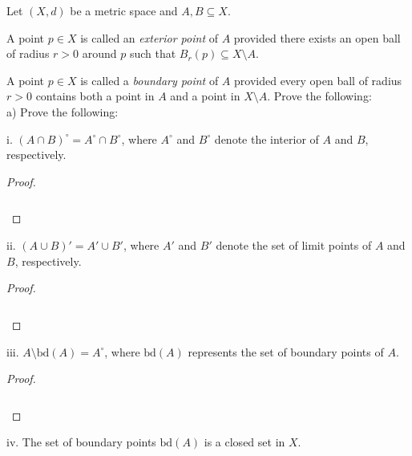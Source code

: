 Let $(X, d)$ be a metric space and $A, B \subseteq X$. 

A point $p \in X$ is called an \emph{exterior point} of $A$ provided there exists an open ball of radius $r > 0$ around
$p$ such that $B_r(p) \subseteq X \setminus A$.

A point $p \in X$ is called a \emph{boundary point} of $A$ provided every open ball of radius $r > 0$ contains both
a point in $A$ and a point in $X \setminus A$. Prove the following: \\

a) Prove the following:

i.  $(A \cap B)^{\circ} = A^{\circ} \cap B^{\circ}$, where $A^{\circ}$ and $B^{\circ}$ denote the interior of $A$ and 
    $B$, respectively. \ \\

\begin{proof}\renewcommand{\qedsymbol}{}\ \\\\
    \begin{align*}
    \end{align*}
\end{proof}

\pagebreak

ii.  $(A \cup B)' = A' \cup B'$, where $A'$ and $B'$ denote the set of limit points of $A$ and $B$, respectively.\ \\

\begin{proof}\renewcommand{\qedsymbol}{}\ \\\\
    \begin{align*}
    \end{align*}
\end{proof}

\pagebreak

iii. $A \setminus \text{bd}(A) = A^{\circ}$, where $\text{bd}(A)$ represents the set of boundary points of $A$.  \ \\

\begin{proof}\renewcommand{\qedsymbol}{}\ \\\\
    \begin{align*}
    \end{align*}
\end{proof}

\pagebreak

iv. The set of boundary points $\text{bd}(A)$ is a closed set in $X$.  \ \\
    
